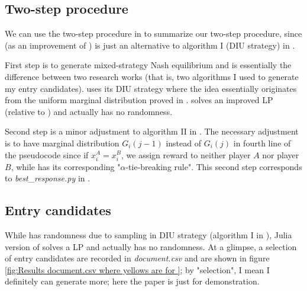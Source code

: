 \documentclass[aos,preprint]{imsart}  %
\numberwithin{table}{section} %
\theoremstyle{plain}
\theoremstyle{plain}
\theoremstyle{TheoremNum}
\newcommand{\1}{{\bf 1}}
\newcommand{\0}{{\vec{\mathbf{0}}}}
\numberwithin{equation}{section}
\begin{document}
\subsection{Two-step procedure}

We can use the two-step procedure in \citep{vu2018efficient} to summarize our two-step procedure, since \citep{behnezhad2017faster} (as an improvement of \citep{ahmadinejad2016duels}) is just an alternative to algorithm I (DIU strategy) in \cite{vu2018efficient}.

First step is to generate mixed-strategy Nash equilibrium and is essentially the difference between two research works (that is, two algorithms I used to generate my entry candidates).  \citep{vu2018efficient} uses its DIU strategy where the idea essentially originates from the uniform marginal distribution proved in \citep{gross1950continuous,laslier2002two}. \citep{behnezhad2017faster} solves an improved LP (relative to \citep{ahmadinejad2016duels}) and actually has no randomness.

Second step is a minor adjustment to algorithm II in \citep{vu2018efficient}. The necessary adjustment is to have marginal distribution $G_i(j-1)$ instead of $G_i(j)$ in fourth line of the pseudocode since if $x_i^A= x_i^B$, we assign  reward to neither player $A$ nor player $B$, while \citep{behnezhad2017faster} has its corresponding "$\alpha$-tie-breaking rule". This second step corresponds to \textit{best\_response.py} in \citep{li2018blotto}.
\subsection{Entry candidates}
While \citep{vu2018efficient} has randomness due to sampling in DIU strategy (algorithm I in \citep{vu2018efficient}), Julia version of \citep{behnezhad2017faster} solves a LP and actually has no randomness. At a glimpse, a selection of entry candidates are recorded in \textit{document.csv} and are shown in figure \ref{fig:Results document.csv where yellows are for }; by "selection", I mean I definitely can generate more; here the paper is just for demonstration.
\end{document}
